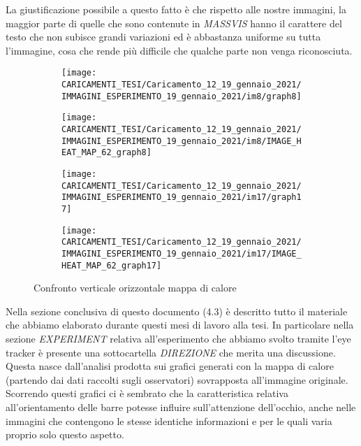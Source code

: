 \documentclass[%
	corpo=12pt,
    twoside,
    stile=classica,
    oldstyle,
    tipotesi=custom,
    greek,
    evenboxes,
]{toptesi}
\begin{document}
{La giustificazione possibile a questo fatto è che rispetto alle nostre immagini, la maggior parte di quelle che sono contenute in \textit{MASSVIS} hanno il carattere del testo che non subisce grandi variazioni ed è abbastanza uniforme su tutta l'immagine, cosa che rende più difficile che qualche parte non venga riconosciuta. 

\begin{figure}[!htb]\centering
\begin{subfigure}
\centering
\texttt{[image: CARICAMENTI\_TESI/Caricamento\_12\_19\_gennaio\_2021/IMMAGINI\_ESPERIMENTO\_19\_gennaio\_2021/im8/graph8]}
\end{subfigure}
\begin{subfigure}
\centering
\texttt{[image: CARICAMENTI\_TESI/Caricamento\_12\_19\_gennaio\_2021/IMMAGINI\_ESPERIMENTO\_19\_gennaio\_2021/im8/IMAGE\_HEAT\_MAP\_62\_graph8]}
\end{subfigure}
\begin{subfigure}
\centering
\texttt{[image: CARICAMENTI\_TESI/Caricamento\_12\_19\_gennaio\_2021/IMMAGINI\_ESPERIMENTO\_19\_gennaio\_2021/im17/graph17]}
\end{subfigure}
\begin{subfigure}
\centering
\texttt{[image: CARICAMENTI\_TESI/Caricamento\_12\_19\_gennaio\_2021/IMMAGINI\_ESPERIMENTO\_19\_gennaio\_2021/im17/IMAGE\_HEAT\_MAP\_62\_graph17]}
\end{subfigure}
\caption{Confronto verticale orizzontale mappa di calore}\label{fig: Orrizzontale_verticale_1}
\end{figure}

Nella sezione conclusiva di questo documento (4.3) è descritto tutto il materiale che abbiamo elaborato durante questi mesi di lavoro alla tesi. In particolare nella sezione \textit{EXPERIMENT} relativa all'esperimento che abbiamo svolto tramite l'eye tracker è presente una sottocartella \textit{DIREZIONE} che merita una discussione. Questa nasce dall'analisi prodotta sui grafici generati con la mappa di calore (partendo dai dati raccolti sugli osservatori) sovrapposta all'immagine originale. Scorrendo questi grafici ci è sembrato che la caratteristica relativa all'orientamento delle barre potesse influire sull'attenzione dell'occhio, anche nelle immagini che contengono le stesse identiche informazioni e per le quali varia proprio solo questo aspetto.





}
\end{document}
